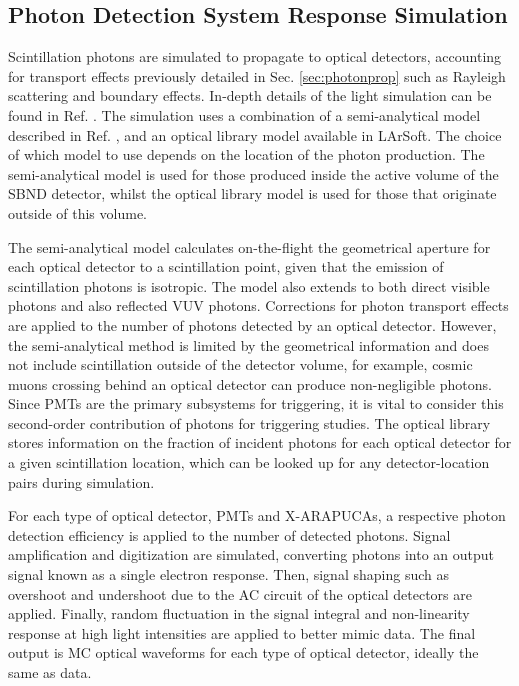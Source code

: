 \subsection{Photon Detection System Response Simulation}
\label{sec:pds_response}

Scintillation photons are simulated to propagate to optical detectors, accounting for transport effects previously detailed in Sec. \ref{sec:photonprop} such as Rayleigh scattering and boundary effects.
In-depth details of the light simulation can be found in Ref. \cite{sbnd_pds_paper}.
The simulation uses a combination of a semi-analytical model described in Ref. \cite{pds_sim}, and an optical library model available in LArSoft.
The choice of which model to use depends on the location of the photon production.
The semi-analytical model is used for those produced inside the active volume of the SBND detector, whilst the optical library model is used for those that originate outside of this volume.

The semi-analytical model calculates on-the-flight the geometrical aperture for each optical detector to a scintillation point, given that the emission of scintillation photons is isotropic.
The model also extends to both direct visible photons and also reflected VUV photons. 
Corrections for photon transport effects are applied to the number of photons detected by an optical detector.
However, the semi-analytical method is limited by the geometrical information and does not include scintillation outside of the detector volume, for example, cosmic muons crossing behind an optical detector can produce non-negligible photons.
Since PMTs are the primary subsystems for triggering, it is vital to consider this second-order contribution of photons for triggering studies.
The optical library stores information on the fraction of incident photons for each optical detector for a given scintillation location, which can be looked up for any detector-location pairs during 
simulation. 

For each type of optical detector, PMTs and X-ARAPUCAs, a respective photon detection efficiency is applied to the number of detected photons.
Signal amplification and digitization are simulated, converting photons into an output signal known as a single electron response.
Then, signal shaping such as overshoot and undershoot due to the AC circuit of the optical detectors are applied.
Finally, random fluctuation in the signal integral and non-linearity response at high light intensities are applied to better mimic data.
The final output is MC optical waveforms for each type of optical detector, ideally the same as data. 

